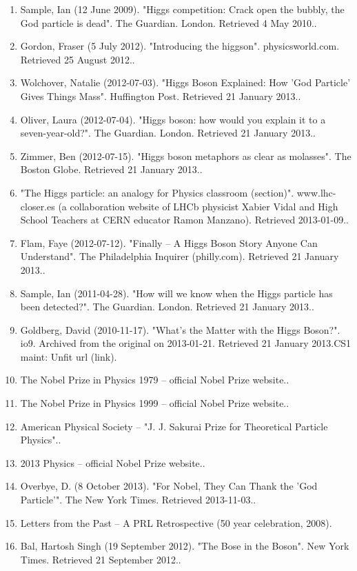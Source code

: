\begin{enumerate}
    \item Sample, Ian (12 June 2009). "Higgs competition: Crack open the bubbly, the God particle is dead". The Guardian. London. Retrieved 4 May 2010..
    \item Gordon, Fraser (5 July 2012). "Introducing the higgson". physicsworld.com. Retrieved 25 August 2012..
    \item Wolchover, Natalie (2012-07-03). "Higgs Boson Explained: How 'God Particle' Gives Things Mass". Huffington Post. Retrieved 21 January 2013..
    \item Oliver, Laura (2012-07-04). "Higgs boson: how would you explain it to a seven-year-old?". The Guardian. London. Retrieved 21 January 2013..
    \item Zimmer, Ben (2012-07-15). "Higgs boson metaphors as clear as molasses". The Boston Globe. Retrieved 21 January 2013..
    \item "The Higgs particle: an analogy for Physics classroom (section)". www.lhc-closer.es (a collaboration website of LHCb physicist Xabier Vidal and High School Teachers at CERN educator Ramon Manzano). Retrieved 2013-01-09..
    \item Flam, Faye (2012-07-12). "Finally – A Higgs Boson Story Anyone Can Understand". The Philadelphia Inquirer (philly.com). Retrieved 21 January 2013..
    \item Sample, Ian (2011-04-28). "How will we know when the Higgs particle has been detected?". The Guardian. London. Retrieved 21 January 2013..
    \item Goldberg, David (2010-11-17). "What's the Matter with the Higgs Boson?". io9. Archived from the original on 2013-01-21. Retrieved 21 January 2013.CS1 maint: Unfit url (link).
    \item The Nobel Prize in Physics 1979 – official Nobel Prize website..
    \item The Nobel Prize in Physics 1999 – official Nobel Prize website..
    \item American Physical Society – "J. J. Sakurai Prize for Theoretical Particle Physics"..
    \item 2013 Physics – official Nobel Prize website..
    \item Overbye, D. (8 October 2013). "For Nobel, They Can Thank the 'God Particle'". The New York Times. Retrieved 2013-11-03..
    \item Letters from the Past – A PRL Retrospective (50 year celebration, 2008).
    \item Bal, Hartosh Singh (19 September 2012). "The Bose in the Boson". New York Times. Retrieved 21 September 2012..

\end{enumerate}
